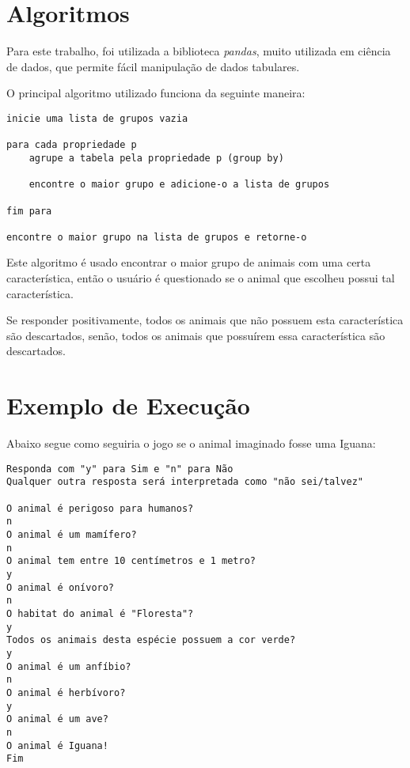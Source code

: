 \documentclass{article}
\begin{document}
\pagebreak
{}

\pagebreak


\section{Algoritmos}

Para este trabalho, foi utilizada a biblioteca \textit{pandas}, muito utilizada em ciência de dados, que permite fácil manipulação de dados tabulares.

O principal algoritmo utilizado funciona da seguinte maneira:

\begin{verbatim}
inicie uma lista de grupos vazia

para cada propriedade p
    agrupe a tabela pela propriedade p (group by)
    
    encontre o maior grupo e adicione-o a lista de grupos

fim para

encontre o maior grupo na lista de grupos e retorne-o
\end{verbatim}

Este algoritmo é usado encontrar o maior grupo de animais com uma certa característica, então o usuário é questionado se o animal que escolheu possui tal característica.

Se responder positivamente, todos os animais que não possuem esta característica são descartados, senão, todos os animais que possuírem essa característica são descartados.


\section{Exemplo de Execução}

Abaixo segue como seguiria o jogo se o animal imaginado fosse uma Iguana:

\begin{verbatim}
Responda com "y" para Sim e "n" para Não
Qualquer outra resposta será interpretada como "não sei/talvez"

O animal é perigoso para humanos?
n
O animal é um mamífero?
n
O animal tem entre 10 centímetros e 1 metro?
y
O animal é onívoro?
n
O habitat do animal é "Floresta"?
y
Todos os animais desta espécie possuem a cor verde?
y
O animal é um anfíbio?
n
O animal é herbívoro?
y
O animal é um ave?
n
O animal é Iguana!
Fim
\end{verbatim}
\end{document}
